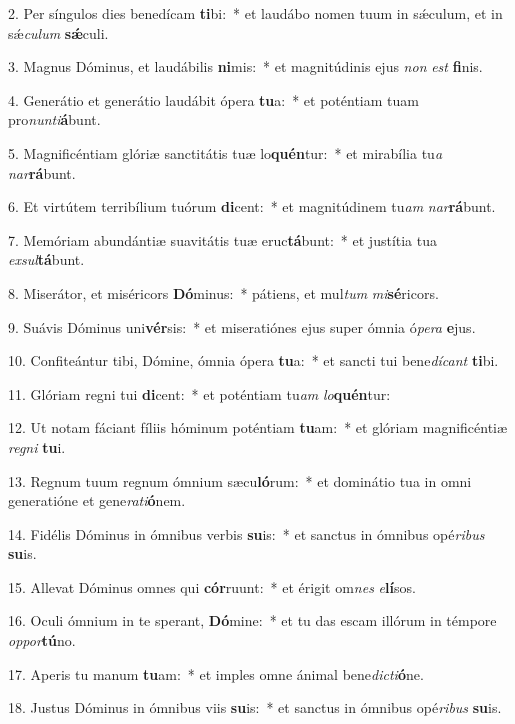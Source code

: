 2. Per síngulos dies benedícam \textbf{ti}bi:~*
	et laudábo nomen tuum in s\'{\ae}culum, et in s\'{\ae}\textit{cu}\textit{lum} \textbf{s\'{\ae}}culi.

3. Magnus Dóminus, et laudábilis \textbf{ni}mis:~*
	et magnitúdinis ejus \textit{non} \textit{est} \textbf{fi}nis.

4. Generátio et generátio laudábit ópera \textbf{tu}a:~*
	et poténtiam tuam pro\textit{nun}\textit{ti}\textbf{á}bunt.

5. Magnificéntiam glóriæ sanctitátis tuæ lo\textbf{quén}tur:~*
	et mirabília tu\textit{a} \textit{nar}\textbf{rá}bunt.

6. Et virtútem terribílium tuórum \textbf{di}cent:~*
	et magnitúdinem tu\textit{am} \textit{nar}\textbf{rá}bunt.

7. Memóriam abundántiæ suavitátis tuæ eruc\textbf{tá}bunt:~*
	et justítia tua \textit{ex}\textit{sul}\textbf{tá}bunt.

8. Miserátor, et miséricors \textbf{Dó}mi\-nus:~*
	pátiens, et mul\textit{tum} \textit{mi}\textbf{sé}ricors.

9. Suávis Dóminus uni\textbf{vér}sis:~*
	et miseratiónes ejus super ómnia ó\textit{pe}\textit{ra} \textbf{e}jus.

10. Confiteántur tibi, Dómine, ómnia ópera \textbf{tu}a:~*
	et sancti tui bene\textit{dí}\textit{cant} \textbf{ti}bi.

11. Glóriam regni tui \textbf{di}cent:~*
	et poténtiam tu\textit{am} \textit{lo}\textbf{quén}tur:

12. Ut notam fáciant fíliis hóminum poténtiam \textbf{tu}am:~*
	et glóriam magnificéntiæ \textit{re}\textit{gni} \textbf{tu}i.

13. Regnum tuum regnum ómnium sæcu\textbf{ló}rum:~*
	et dominátio tua in omni generatióne et gene\textit{ra}\textit{ti}\textbf{ó}nem.

14. Fidélis Dóminus in ómnibus verbis \textbf{su}is:~*
	et sanctus in ómnibus opé\textit{ri}\textit{bus} \textbf{su}is.

15. Allevat Dóminus omnes qui \textbf{cór}ruunt:~*
	et érigit om\textit{nes} \textit{e}\textbf{lí}sos.

16. Oculi ómnium in te sperant, \textbf{Dó}mine:~*
	et tu das escam illórum in témpore \textit{op}\textit{por}\textbf{tú}no.

17. Aperis tu manum \textbf{tu}am:~*
	et imples omne ánimal bene\textit{dic}\textit{ti}\textbf{ó}ne.

18. Justus Dóminus in ómnibus viis \textbf{su}is:~*
	et sanctus in ómnibus opé\textit{ri}\textit{bus} \textbf{su}is.

